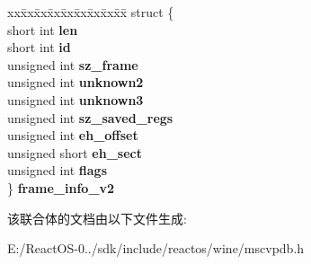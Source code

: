 \begin{DoxyCompactItemize}
\begin{tabbing}
\end{tabbing}\item 
\mbox{\label{unioncodeview__symbol_a730a1c7aeb47b579fcd8ff1239b2e800}} 
\begin{tabbing}
xx\=xx\=xx\=xx\=xx\=xx\=xx\=xx\=xx\=\kill
struct \{\\
\>short int {\bfseries len}\\
\>short int {\bfseries id}\\
\>unsigned int {\bfseries sz\_frame}\\
\>unsigned int {\bfseries unknown2}\\
\>unsigned int {\bfseries unknown3}\\
\>unsigned int {\bfseries sz\_saved\_regs}\\
\>unsigned int {\bfseries eh\_offset}\\
\>unsigned short {\bfseries eh\_sect}\\
\>unsigned int {\bfseries flags}\\
\} {\bfseries frame\_info\_v2}\\

\end{tabbing}\end{DoxyCompactItemize}


该联合体的文档由以下文件生成\+:\begin{DoxyCompactItemize}
\item 
E\+:/\+React\+O\+S-\/0../sdk/include/reactos/wine/mscvpdb.\+h\end{DoxyCompactItemize}

